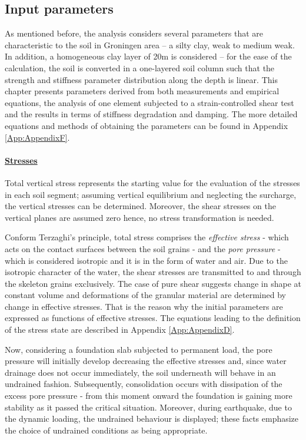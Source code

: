 \documentclass[12pt,a4paper]{report}
\begin{document}
\subsection{Input parameters}
As mentioned before, the analysis considers several parameters that are characteristic to the soil in Groningen area – a silty clay, weak to medium weak. In addition, a homogeneous clay layer of 20m is considered – for the ease of the calculation, the soil is converted in a one-layered soil column such that the strength and stiffness parameter distribution  along the depth is linear. This chapter presents parameters derived from both measurements and empirical equations, the analysis of one element subjected to a strain-controlled shear test and the results in terms of stiffness degradation and damping. The more detailed equations and methods of obtaining the parameters can be found in Appendix \ref{App:AppendixF}.	

\paragraph{\underline{Stresses}}
Total vertical stress represents the starting value for the evaluation of the stresses in each soil segment; assuming vertical equilibrium and neglecting the surcharge, the vertical stresses can be determined. Moreover, the shear stresses on the vertical planes are assumed zero hence, no stress transformation is needed.

Conform Terzaghi's principle, total stress comprises the \textit{effective stress} - which acts on the contact surfaces between the soil grains - and the \textit{pore pressure} - which is considered isotropic and it is in the form of water and air. Due to the isotropic character of the water, the shear stresses are transmitted to and through the skeleton grains exclusively. The case of pure shear suggests change in shape at constant volume and deformations of the granular material are determined by change in effective stresses. That is the reason why the initial parameters are expressed as functions of effective stresses. The equations leading to the definition of the stress state are described in Appendix \ref{App:AppendixD}.

Now, considering a foundation slab subjected to permanent load, the pore pressure will initially develop decreasing the effective stresses and, since water drainage does not occur immediately, the soil underneath will behave in an undrained fashion. Subsequently, consolidation occurs with dissipation of the excess pore pressure - from this moment onward the foundation is gaining more stability as it passed the critical situation. Moreover, during earthquake, due to the dynamic loading, the undrained behaviour is displayed; these facts emphasize the choice of undrained conditions as being appropriate. 
\end{document}
